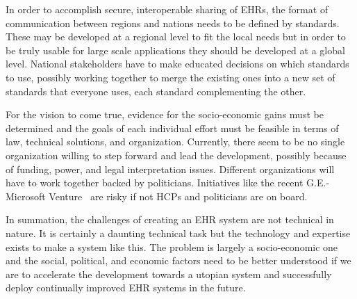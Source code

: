 \documentclass[14pt]{article}
\begin{document}

In order to accomplish secure, interoperable sharing of \glspl{EHR}, the format of communication between regions and nations needs to be defined by standards. These may be developed at a regional level to fit the local needs but in order to be truly usable for large scale applications they should be developed at a global level. National stakeholders have to make educated decisions on which standards to use, possibly working together to merge the existing ones into a new set of standards that everyone uses, each standard complementing the other.

For the vision to come true, evidence for the socio-economic gains must be determined and the goals of each individual effort must be feasible in terms of law, technical solutions, and organization. Currently, there seem to be no single
organization willing to step forward and lead the development, possibly because of funding, power, and legal interpretation issues. Different organizations will have to work together backed by politicians. Initiatives like the recent G.E.-Microsoft Venture~\cite{Bits} are risky if not \glspl{HCP} and politicians are on board.

In summation, the challenges of creating an \gls{EHR} system are not technical in nature. It is certainly a daunting technical task but the technology and expertise exists to make a system like this. The problem is largely a socio-economic one and the social, political, and economic factors need to be better understood if we are to accelerate the development towards a utopian system and successfully deploy continually improved \gls{EHR} systems in the future.

\newpage
\printglossaries
\newpage

\begin{appendix}
\end{appendix}



 
 
\end{document}

